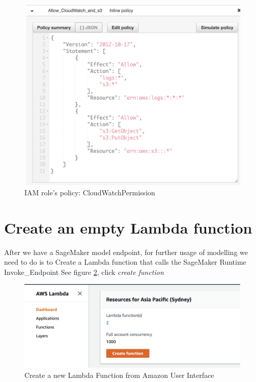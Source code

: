 \documentclass[12pt]{article}
\begin{document}
\begin{figure}[H]
\centering
\begin{minipage}{0.6\textwidth}
  \centering
  \includegraphics[width=1\linewidth]{role_example_2.png}
   \caption{IAM role's policy: CloudWatchPermission}
   \label{fig:role_example_2}
\end{minipage}%
\end{figure}




\newpage
\section{Create an empty Lambda function}
After we have a SageMaker model endpoint, for further usage of modelling we need to do is to Create a Lambda function that calls the SageMaker Runtime Invoke\_Endpoint
\noindent
See figure \ref{fig:create_lambda_1}, click \textit{create function}

\begin{figure}[H]
\centering
\begin{minipage}{1\textwidth}
  \centering
  \includegraphics[width=1\linewidth]{create_lambda_1.png}
   \caption{Create a new Lambda Function from Amazon User Interface}
   \label{fig:create_lambda_1}
\end{minipage}%
\end{figure}
\noindent
\end{document}
